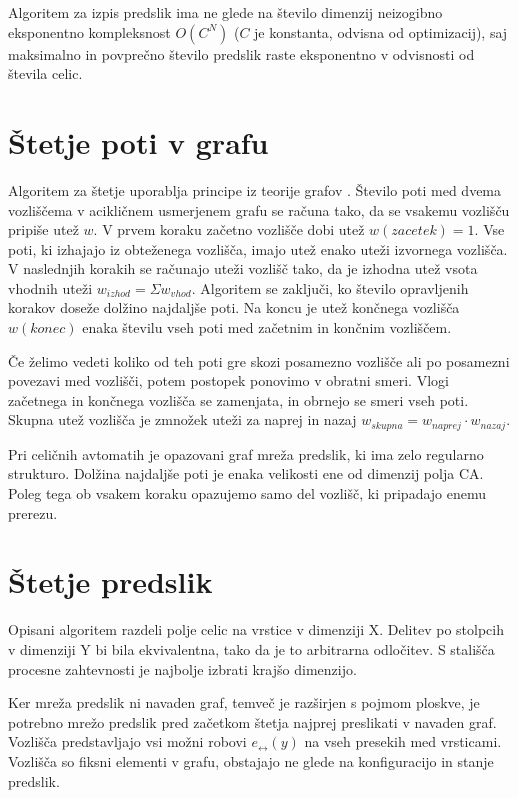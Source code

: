 \documentclass[12pt,a4paper,openany,twoside]{book}
\begin{document}
Algoritem za izpis predslik ima ne glede na število dimenzij
neizogibno eksponentno kompleksnost \(O(C^N)\) (\(C\) je konstanta, odvisna od optimizacij),
saj maksimalno in povprečno število predslik raste eksponentno
v odvisnosti od števila celic.

\section{Štetje poti v grafu}

Algoritem za štetje uporablja principe iz teorije grafov \cite{DBLP:journals/corr/cs-DL-0309023}.
Število poti med dvema vozliščema v acikličnem usmerjenem grafu se računa tako,
da se vsakemu vozlišču pripiše utež \(w\).
V prvem koraku začetno vozlišče dobi utež \(w(zacetek)=1\).
Vse poti, ki izhajajo iz obteženega vozlišča,
imajo utež enako uteži izvornega vozlišča.
V naslednjih korakih se računajo uteži vozlišč tako,
da je izhodna utež vsota vhodnih uteži \(w_{izhod}=\Sigma w_{vhod}\).
Algoritem se zaključi, ko število opravljenih korakov doseže dolžino najdaljše poti.
Na koncu je utež končnega vozlišča \(w(konec)\)
enaka številu vseh poti med začetnim in končnim vozliščem.

Če želimo vedeti koliko od teh poti gre skozi posamezno vozlišče
ali po posamezni povezavi med vozlišči,
potem postopek ponovimo v obratni smeri.
Vlogi začetnega in končnega vozlišča se zamenjata,
in obrnejo se smeri vseh poti.
Skupna utež vozlišča je zmnožek uteži za naprej in nazaj
\(w_{skupna} = w_{naprej} \cdot w_{nazaj}\).

Pri celičnih avtomatih je opazovani graf mreža predslik, ki ima zelo regularno strukturo.
Dolžina najdaljše poti je enaka velikosti ene od dimenzij polja CA.
Poleg tega ob vsakem koraku opazujemo samo del vozlišč, ki pripadajo enemu prerezu.

\section{Štetje predslik}

Opisani algoritem razdeli polje celic na vrstice v dimenziji X.
Delitev po stolpcih v dimenziji Y bi bila ekvivalentna, tako da je to arbitrarna odločitev.
S stališča procesne zahtevnosti je najbolje izbrati krajšo dimenzijo.

Ker mreža predslik ni navaden graf, temveč je razširjen s pojmom ploskve,
je potrebno mrežo predslik pred začetkom štetja najprej preslikati v navaden graf.
Vozlišča predstavljajo vsi možni robovi \(e_{\leftrightarrow}(y)\) na vseh presekih med vrsticami.
Vozlišča so fiksni elementi v grafu, obstajajo ne glede na konfiguracijo in stanje predslik.
\end{document}
